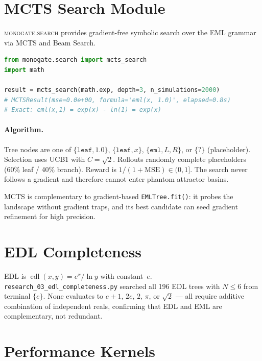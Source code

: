 \documentclass[11pt,a4paper]{article}
\begin{document}
\section{MCTS Search Module}
\label{sec:mcts}

\textsc{monogate.search} provides gradient-free symbolic search over
the EML grammar via MCTS and Beam Search.

\begin{lstlisting}[language=Python]
from monogate.search import mcts_search
import math

result = mcts_search(math.exp, depth=3, n_simulations=2000)
# MCTSResult(mse=0.0e+00, formula='eml(x, 1.0)', elapsed=0.8s)
# Exact: eml(x,1) = exp(x) - ln(1) = exp(x)
\end{lstlisting}

\paragraph{Algorithm.}
Tree nodes are one of
$\{\mathtt{leaf},1.0\}$, $\{\mathtt{leaf},x\}$, $\{\mathtt{eml},L,R\}$,
or $\{?\}$ (placeholder).
Selection uses UCB1 with $C=\sqrt{2}$.
Rollouts randomly complete placeholders (60\% leaf / 40\% branch).
Reward is $1/(1+\mathrm{MSE})\in(0,1]$.
The search never follows a gradient and therefore cannot enter phantom
attractor basins.

MCTS is complementary to gradient-based \texttt{EMLTree.fit()}:
it probes the landscape without gradient traps, and its best candidate
can seed gradient refinement for high precision.

\section{EDL Completeness}
\label{sec:edl}

EDL is $\operatorname{edl}(x,y)=e^x/\ln y$ with constant~$e$.
\texttt{research\_03\_edl\_completeness.py} searched all 196 EDL trees
with $N\leq6$ from terminal $\{e\}$.
None evaluates to $e+1$, $2e$, $2$, $\pi$, or $\sqrt{2}$ ---
all require additive combination of independent reals, confirming
that EDL and EML are complementary, not redundant.

\section{Performance Kernels}
\label{sec:perf}
\end{document}
